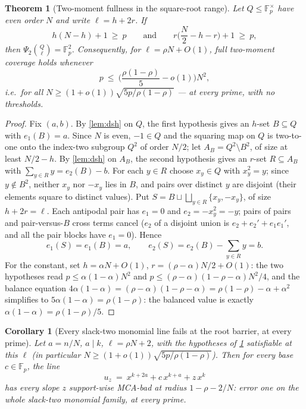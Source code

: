 \documentclass[11pt]{article}
\newtheorem{theorem}{Theorem}[section]
\newtheorem{corollary}[corollary]{Corollary}
\theoremstyle{definition}
\newcommand{\F}{\mathbb F}
\begin{document}
\begin{theorem}[Two-moment fullness in the square-root range]\label{thm:twomoment}
Let $Q\le\F_p^\times$ have even order $N$ and write $\ell=h+2r$.  If
\[
        h(N-h)+1\ \ge\ p
        \qquad\text{and}\qquad
        r\Big(\frac N2-h-r\Big)+1\ \ge\ p,
\]
then $\Psi_2\binom Q\ell=\F_p^2$.  Consequently, for $\ell=\rho N+O(1)$, full two-moment coverage holds whenever
\[
        p\ \le\ \Big(\frac{\rho(1-\rho)}5-o(1)\Big)N^2 ,
\]
i.e.\ for all $N\ge(1+o(1))\sqrt{5p/\rho(1-\rho)}$ --- at every prime, with no thresholds.
\end{theorem}

\begin{proof}
Fix $(a,b)$.  By \cref{lem:dsh} on $Q$, the first hypothesis gives an $h$-set $B\subseteq Q$ with $e_1(B)=a$.  Since $N$ is even, $-1\in Q$ and the squaring map on $Q$ is two-to-one onto the index-two subgroup $Q^2$ of order $N/2$; let $A_B=Q^2\setminus B^2$, of size at least $N/2-h$.  By \cref{lem:dsh} on $A_B$, the second hypothesis gives an $r$-set $R\subseteq A_B$ with $\sum_{y\in R}y=e_2(B)-b$.  For each $y\in R$ choose $x_y\in Q$ with $x_y^2=y$; since $y\notin B^2$, neither $x_y$ nor $-x_y$ lies in $B$, and pairs over distinct $y$ are disjoint (their elements square to distinct values).  Put $S=B\sqcup\bigsqcup_{y\in R}\{x_y,-x_y\}$, of size $h+2r=\ell$.  Each antipodal pair has $e_1=0$ and $e_2=-x_y^2=-y$; pairs of pairs and pair-versus-$B$ cross terms cancel ($e_2$ of a disjoint union is $e_2+e_2'+e_1e_1'$, and all the pair blocks have $e_1=0$).  Hence
\[
        e_1(S)=e_1(B)=a,\qquad e_2(S)=e_2(B)-\sum_{y\in R}y=b .
\]
For the constant, set $h=\alpha N+O(1)$, $r=(\rho-\alpha)N/2+O(1)$: the two hypotheses read $p\le\alpha(1-\alpha)N^2$ and $p\le(\rho-\alpha)(1-\rho-\alpha)N^2/4$, and the balance equation $4\alpha(1-\alpha)=(\rho-\alpha)(1-\rho-\alpha)=\rho(1-\rho)-\alpha+\alpha^2$ simplifies to $5\alpha(1-\alpha)=\rho(1-\rho)$: the balanced value is exactly $\alpha(1-\alpha)=\rho(1-\rho)/5$.
\end{proof}

\begin{corollary}[Every slack-two monomial line fails at the root barrier, at every prime]\label{cor:twomomentmca}
Let $a=n/N$, $a\mid k$, $\ell=\rho N+2$, with the hypotheses of \cref{thm:twomoment} satisfiable at this $\ell$ (in particular $N\ge(1+o(1))\sqrt{5p/\rho(1-\rho)}$).  Then for \emph{every} base $c\in\F_p$, the line
\[
        u_z\ =\ x^{k+2a}+c\,x^{k+a}+z\,x^{k}
\]
has every slope $z$ support-wise MCA-bad at radius $1-\rho-2/N$: error one on the whole slack-two monomial family, at every prime.
\end{corollary}
\end{document}
